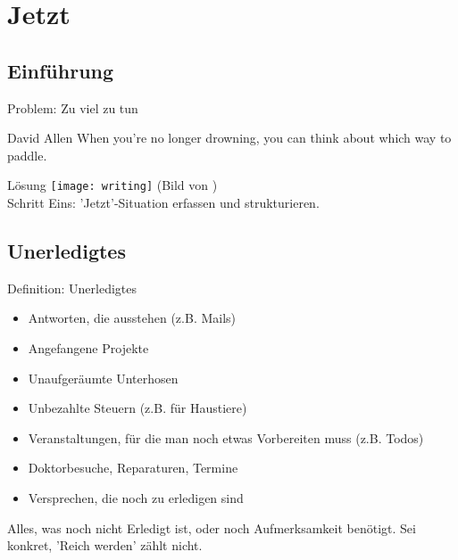\section{Jetzt}

\subsection{Einführung}

\begin{frame}[c]{Problem: Zu viel zu tun}
    \large
    \begin{aquote}{David Allen}
        When you're no longer drowning, you can think about which way to
        paddle.
    \end{aquote}
\end{frame}


\begin{frame}[c]{Lösung}
    \texttt{[image: writing]} (Bild von \cite{writing-pic}) \\
    \vspace{0.5cm}
    Schritt Eins: 'Jetzt'-Situation erfassen und strukturieren.
\end{frame}


\subsection{Unerledigtes}

\begin{frame}[c]{Definition: Unerledigtes}
    \begin{itemize}[<+(1)->]
        \item Antworten, die ausstehen (z.B. Mails)
        \item Angefangene Projekte
        \item Unaufgeräumte Unterhosen
        \item Unbezahlte Steuern (z.B. für Haustiere)
        \item Veranstaltungen, für die man noch etwas Vorbereiten muss (z.B. Todos)
        \item Doktorbesuche, Reparaturen, Termine
        \item Versprechen, die noch zu erledigen sind
    \end{itemize}
    \pause
    Alles, was noch nicht Erledigt ist, oder noch Aufmerksamkeit
    benötigt. Sei konkret, 'Reich werden' zählt nicht.
\end{frame}


